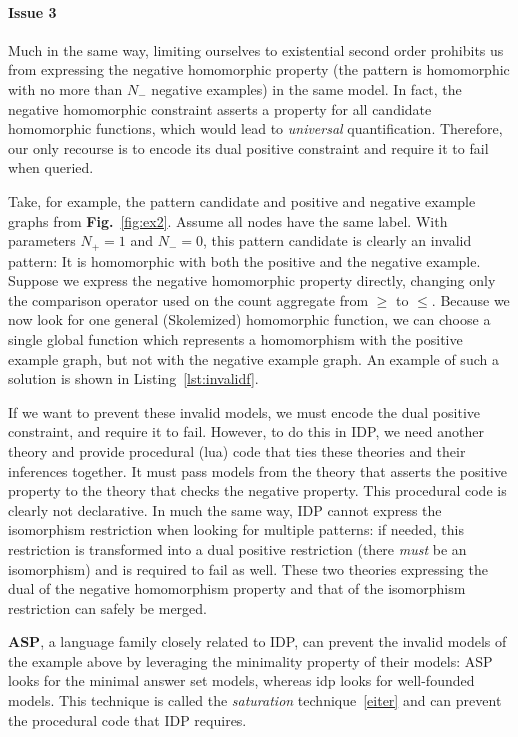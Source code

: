 \paragraph{Issue 3} Much in the same way, limiting ourselves to existential second order prohibits us from expressing the negative homomorphic property (the pattern is homomorphic with no more than $N_{-}$ negative examples) in the same model.
In fact, the negative homomorphic constraint asserts a property for all candidate homomorphic functions, which would lead to \emph{universal} quantification.
Therefore, our only recourse is to encode its dual positive constraint and require it to fail when queried.

Take, for example, the pattern candidate and positive and negative example graphs from \textbf{Fig.}~\ref{fig:ex2}.
Assume all nodes have the same label.
With parameters $N_{+}=1$ and $N_{-}=0$, this pattern candidate is clearly an invalid pattern: It is homomorphic with both the positive and the negative example.
Suppose we express the negative homomorphic property directly, changing only the comparison operator used on the count aggregate from $\geq$ to $\leq$.
Because we now look for one general (Skolemized) homomorphic function, we can choose a single global function which represents a homomorphism with the positive example graph, but not with the negative example graph.
An example of such a solution is shown in Listing~\ref{lst:invalidf}.

If we want to prevent these invalid models, we must encode the dual positive constraint, and require it to fail. 
However, to do this in IDP, we need another theory and provide procedural (lua) code that ties these theories and their inferences together. 
It must pass models from the theory that asserts the positive property to the theory that checks the negative property. This procedural code is clearly not declarative.
In much the same way, IDP cannot express the isomorphism restriction when looking for multiple patterns: if needed, this restriction is transformed into a dual positive restriction (there \emph{must} be an isomorphism) and is required to fail as well. These two theories expressing the dual of the negative homomorphism property and that of the isomorphism restriction can safely be merged.


\textbf{ASP}, a language family closely related to IDP, can prevent the invalid models of the example above by leveraging the minimality property of their models: ASP looks for the minimal answer set models, whereas idp looks for well-founded models.
This technique is called the \emph{saturation} technique~\ref{eiter} and can prevent the procedural code that IDP requires.

